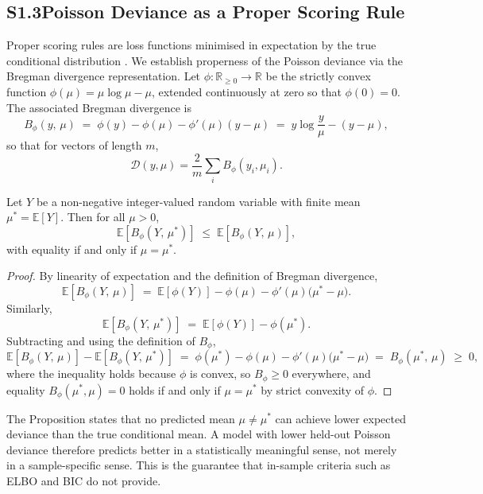 \subsection*{S1.3\quad Poisson Deviance as a Proper Scoring Rule}

Proper scoring rules are loss functions minimised in expectation by the true conditional distribution \citep{Gneiting2007ProperScoring}.
We establish properness of the Poisson deviance via the Bregman divergence representation.
Let $\phi: \mathbb{R}_{\geq 0} \to \mathbb{R}$ be the strictly convex function $\phi(\mu) = \mu \log \mu - \mu$, extended continuously at zero so that $\phi(0)=0$.
The associated Bregman divergence is
\[
  B_{\phi}(y,\,\mu)
  \;=\;
  \phi(y) - \phi(\mu) - \phi'(\mu)(y - \mu)
  \;=\;
  y \log\frac{y}{\mu} - (y - \mu),
\]
so that for vectors of length $m$,
\[
  \mathcal{D}(y,\mu) = \frac{2}{m} \sum_i B_\phi(y_i, \mu_i).
\]

\begin{proposition}
Let $Y$ be a non-negative integer-valued random variable with finite mean $\mu^* = \mathbb{E}[Y]$.
Then for all $\mu > 0$,
\[
  \mathbb{E}\!\left[B_\phi(Y,\,\mu^*)\right]
  \;\leq\;
  \mathbb{E}\!\left[B_\phi(Y,\,\mu)\right],
\]
with equality if and only if $\mu = \mu^*$.
\end{proposition}

\begin{proof}
By linearity of expectation and the definition of Bregman divergence,
\[
  \mathbb{E}\!\left[B_\phi(Y,\,\mu)\right]
  \;=\;
  \mathbb{E}[\phi(Y)] - \phi(\mu) - \phi'(\mu)\bigl(\mu^* - \mu\bigr).
\]
Similarly,
\[
  \mathbb{E}\!\left[B_\phi(Y,\,\mu^*)\right]
  \;=\;
  \mathbb{E}[\phi(Y)] - \phi(\mu^*).
\]
Subtracting and using the definition of $B_\phi$,
\[
  \mathbb{E}\!\left[B_\phi(Y,\,\mu)\right]
  - \mathbb{E}\!\left[B_\phi(Y,\,\mu^*)\right]
  \;=\;
  \phi(\mu^*) - \phi(\mu) - \phi'(\mu)\bigl(\mu^* - \mu\bigr)
  \;=\;
  B_\phi(\mu^*,\,\mu)
  \;\geq\; 0,
\]
where the inequality holds because $\phi$ is convex, so $B_\phi \geq 0$ everywhere, and equality $B_\phi(\mu^*, \mu) = 0$ holds if and only if $\mu = \mu^*$ by strict convexity of $\phi$.
\end{proof}

\noindent The Proposition states that no predicted mean $\mu \neq \mu^*$ can achieve lower expected deviance than the true conditional mean.
A model with lower held-out Poisson deviance therefore predicts better in a statistically meaningful sense, not merely in a sample-specific sense.
This is the guarantee that in-sample criteria such as ELBO and BIC do not provide.

